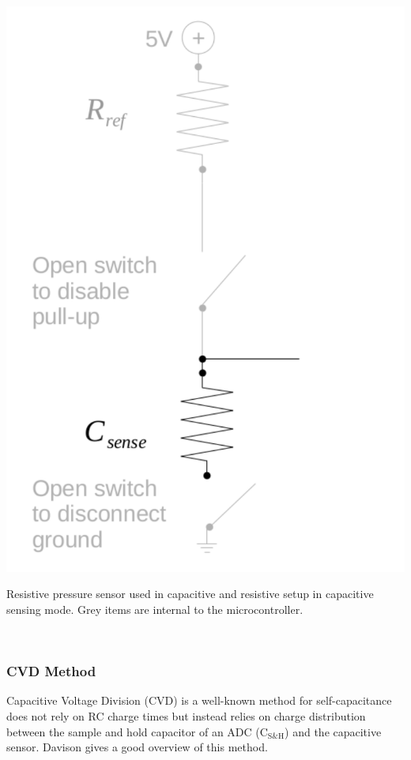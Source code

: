 \documentclass{sigchi-ext}
\begin{document}
\begin{marginfigure}
\begin{minipage}{\marginparwidth}
\centering
\includegraphics[width=0.9\columnwidth]{figures/cap_res_setup_cap}
\caption{Resistive pressure sensor used in capacitive and resistive setup in
capacitive sensing mode. Grey items are internal to the
microcontroller.}~\label{fig:cap_res_setup_cap}
\end{minipage}
\end{marginfigure}


\subsubsection{CVD Method}
Capacitive Voltage Division (CVD) is a well-known method for self-capacitance does not rely on RC charge times
but instead relies on charge distribution between the sample and hold capacitor
of an ADC ($\textrm{C}_{\textrm{S\&H}}$) and the capacitive sensor. Davison \cite{Davison2013a} gives a
good overview of this method.
\end{document}
